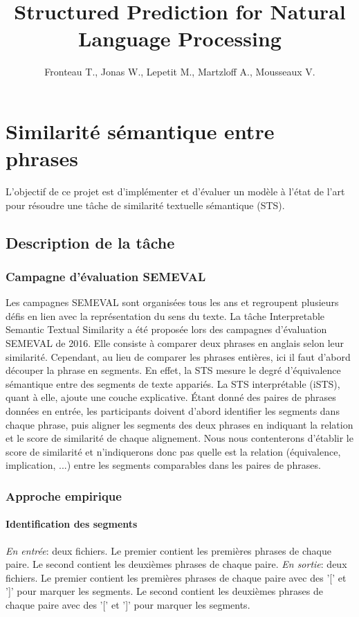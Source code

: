 \documentclass[a4paper, twoside, 11pt]{article}
\title{Structured Prediction for Natural Language Processing}
\author{Fronteau T., Jonas W., Lepetit M., Martzloff A., Mousseaux V.}
\begin{document}
 \maketitle
 \section{Similarité sémantique entre phrases}
    L'objectif de ce projet est d'implémenter et d'évaluer un modèle à l’état de l’art pour résoudre une tâche de similarité textuelle sémantique (STS).

    \subsection{Description de la tâche}

        \subsubsection{Campagne d’évaluation SEMEVAL}

    Les campagnes SEMEVAL sont organisées tous les ans et regroupent plusieurs défis en lien avec la représentation du sens du texte. La tâche Interpretable Semantic Textual Similarity a été proposée lors des campagnes d’évaluation SEMEVAL de 2016. Elle consiste à comparer deux phrases en anglais selon leur similarité. Cependant, au lieu de comparer les phrases entières, ici il faut d’abord découper la phrase en segments. En effet, la STS mesure le degré d'équivalence sémantique entre des segments de texte appariés. La STS interprétable (iSTS), quant à elle, ajoute une couche explicative. Étant donné des paires de phrases données en entrée, les participants doivent d'abord identifier les segments dans chaque phrase, puis aligner les segments des deux phrases en indiquant la relation et le score de similarité de chaque alignement. Nous nous contenterons d'établir le score de similarité et n'indiquerons donc pas quelle est la relation (équivalence, implication, ...) entre les segments comparables dans les paires de phrases.

        \subsubsection{Approche empirique}

    \paragraph{Identification des segments}
    \hfill \break
    \textit{En entrée}: deux fichiers. Le premier contient les premières phrases de chaque paire. Le second contient les deuxièmes phrases de chaque paire. \hfill \break
    \textit{En sortie}: deux fichiers. Le premier contient les premières phrases de chaque paire avec des '[' et ']' pour marquer les segments. Le second contient les deuxièmes phrases de chaque paire avec des '[' et ']' pour marquer les segments.
\end{document}
